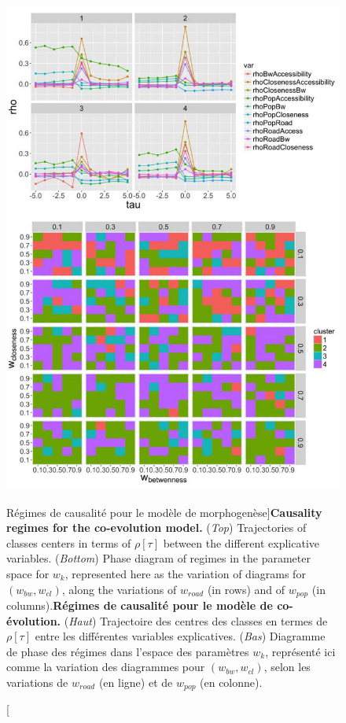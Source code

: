 \begin{figure}
	\includegraphics[width=\linewidth,height=0.93\textheight]{Figures/Final/7-2-2-fig-mesocoevolmodel-causality}
	\caption[Causality regimes for the morphogenesis model][Régimes de causalité pour le modèle de morphogenèse]{\textbf{Causality regimes for the co-evolution model.} (\textit{Top}) Trajectories of classes centers in terms of $\rho[\tau]$ between the different explicative variables. (\textit{Bottom}) Phase diagram of regimes in the parameter space for $w_k$, represented here as the variation of diagrams for $(w_{bw},w_{cl})$, along the variations of $w_{road}$ (in rows) and of $w_{pop}$ (in columns).\label{fig:mesocoevolmodel:causality}}{\textbf{Régimes de causalité pour le modèle de co-évolution.} (\textit{Haut}) Trajectoire des centres des classes en termes de $\rho[\tau]$ entre les différentes variables explicatives. (\textit{Bas}) Diagramme de phase des régimes dans l'espace des paramètres $w_k$, représenté ici comme la variation des diagrammes pour $(w_{bw},w_{cl})$, selon les variations de $w_{road}$ (en ligne) et de $w_{pop}$ (en colonne). \label{fig:mesocoevolmodel:causality}}
\end{figure}





